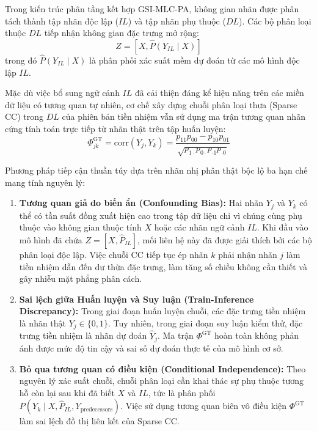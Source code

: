 \documentclass[11pt,a4paper]{article}
\begin{document}
Trong kiến trúc phân tầng kết hợp GSI-MLC-PA, không gian nhãn được phân tách thành tập nhãn độc lập ($IL$) và tập nhãn phụ thuộc ($DL$). Các bộ phân loại thuộc $DL$ tiếp nhận không gian đặc trưng mở rộng:
\begin{equation}
Z = [X, \hat{P}(Y_{IL} \mid X)]
\end{equation}
trong đó $\hat{P}(Y_{IL} \mid X)$ là phân phối xác suất mềm dự đoán từ các mô hình độc lập $IL$.

Mặc dù việc bổ sung ngữ cảnh $IL$ đã cải thiện đáng kể hiệu năng trên các miền dữ liệu có tương quan tự nhiên, cơ chế xây dựng chuỗi phân loại thưa (Sparse CC) trong $DL$ của phiên bản tiền nhiệm vẫn sử dụng ma trận tương quan nhãn cứng tính toán trực tiếp từ nhãn thật trên tập huấn luyện:
\begin{equation}
\Phi_{jk}^{\text{GT}} = \text{corr}(Y_j, Y_k) = \frac{p_{11} p_{00} - p_{10} p_{01}}{\sqrt{p_{1\cdot} p_{0\cdot} p_{\cdot 1} p_{\cdot 0}}}
\end{equation}

Phương pháp tiếp cận thuần túy dựa trên nhãn nhị phân thật bộc lộ ba hạn chế mang tính nguyên lý:
\begin{enumerate}[leftmargin=*]
  \item \textbf{Tương quan giả do biến ẩn (Confounding Bias):} Hai nhãn $Y_j$ và $Y_k$ có thể có tần suất đồng xuất hiện cao trong tập dữ liệu chỉ vì chúng cùng phụ thuộc vào không gian thuộc tính $X$ hoặc các nhãn ngữ cảnh $IL$. Khi đầu vào mô hình đã chứa $Z = [X, \hat{P}_{IL}]$, mối liên hệ này đã được giải thích bởi các bộ phân loại độc lập. Việc chuỗi CC tiếp tục ép nhãn $k$ phải nhận nhãn $j$ làm tiền nhiệm dẫn đến dư thừa đặc trưng, làm tăng số chiều không cần thiết và gây nhiễu mặt phẳng phân cách.
  \item \textbf{Sai lệch giữa Huấn luyện và Suy luận (Train-Inference Discrepancy):} Trong giai đoạn huấn luyện chuỗi, các đặc trưng tiền nhiệm là nhãn thật $Y_j \in \{0, 1\}$. Tuy nhiên, trong giai đoạn suy luận kiểm thử, đặc trưng tiền nhiệm là nhãn dự đoán $\hat{Y}_j$. Ma trận $\Phi^{\text{GT}}$ hoàn toàn không phản ánh được mức độ tin cậy và sai số dự đoán thực tế của mô hình cơ sở.
  \item \textbf{Bỏ qua tương quan có điều kiện (Conditional Independence):} Theo nguyên lý xác suất chuỗi, chuỗi phân loại cần khai thác sự phụ thuộc tương hỗ còn lại sau khi đã biết $X$ và $IL$, tức là phân phối $P(Y_k \mid X, \hat{P}_{IL}, Y_{\text{predecessors}})$. Việc sử dụng tương quan biên vô điều kiện $\Phi^{\text{GT}}$ làm sai lệch đồ thị liên kết của Sparse CC.
\end{enumerate}
\end{document}
